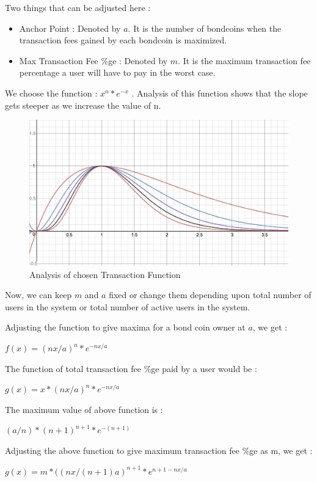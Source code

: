 Two things that can be adjusted here :
\begin{itemize}
    \item Anchor Point : Denoted by $a$. It is the number of bondcoins when the transaction fees gained by each bondcoin is maximized.
    \item Max Transaction Fee \%ge : Denoted by $m$. It is the maximum transaction fee percentage a user will have to pay in the worst case.
\end{itemize}

We choose the function : $x^n*e^{-x}$ . Analysis of this function shows that the slope gets steeper as we increase the value of n.

\begin{figure}[!htbp]
\centering
\includegraphics[width=14cm]{Pictures/analyseTF.png}
\caption{Analysis of chosen Transaction Function}
\end{figure}

Now, we can keep $m$ and $a$ fixed or change them depending upon total number of users in the system or total number of active users in the system.

Adjusting the function to give maxima for a bond coin owner at $a$, we get : \\
\centerline{$f(x) = (nx/a)^n*e^{-nx/a}$}

The function of total transaction fee \%ge paid by a user would be : \\
\centerline{$g(x) = x*(nx/a)^n*e^{-nx/a}$}

The maximum value of above function is : \\
\centerline{$({a/n})*(n+1)^{n+1}*e^{-(n+1)}$}

Adjusting the above function to give maximum transaction fee \%ge as m, we get : \\
\centerline{$g(x) = m*((nx/{(n+1)a})^{n+1}*e^{n+1-{nx/a}}$}


